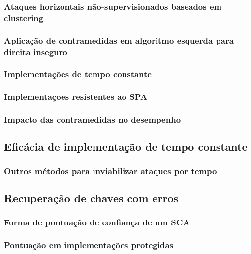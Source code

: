 \documentclass[12pt]{article}
\begin{document}
\subsubsection{Ataques horizontais não-supervisionados baseados em clustering}

\subsubsection{Aplicação de contramedidas em algoritmo esquerda para direita
inseguro}

\subsubsection{Implementações de tempo constante}

\subsubsection{Implementações resistentes ao SPA}

\subsubsection{Impacto das contramedidas no desempenho}

\subsection{Eficácia de implementação de tempo constante}

\subsubsection{Outros métodos para inviabilizar ataques por tempo}

\subsection{Recuperação de chaves com erros}

\subsubsection{Forma de pontuação de confiança de um SCA}

\subsubsection{Pontuação em implementações protegidas}
\end{document}
